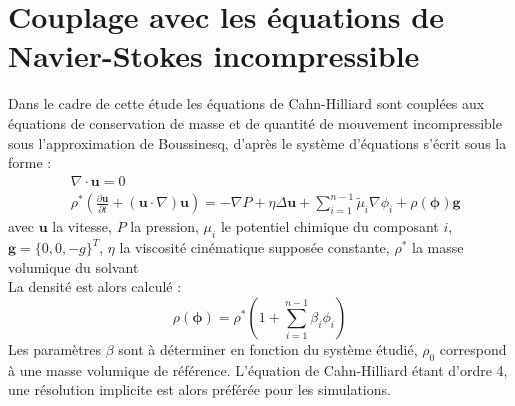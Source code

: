 \section{Couplage avec les équations de Navier-Stokes incompressible}
Dans le cadre de cette étude les équations de Cahn-Hilliard sont couplées aux équations de conservation de masse et de quantité de mouvement incompressible sous l'approximation de Boussinesq, d'après \cite{kim_phase-field_2012} le système d'équations s'écrit sous la forme :
\begin{subequations}
\begin{align}
&\nabla \cdot \mathbf{u} = 0\\
&\rho^* \left (\frac{\partial \mathbf{u}}{\partial t} + (\mathbf{u} \cdot {\nabla})\mathbf{u}\right) = -{\nabla} P +\eta \Delta \mathbf{u}+\sum_{i=1}^{n-1} \tilde{\mu}_i{\nabla} \phi_i + \rho(\bm{\phi}) \mathbf{g}
\end{align}
\end{subequations}
avec $\mathbf{u}$ la vitesse, $P$ la pression, $\mu_i$ le potentiel chimique du composant $i$, $\mathbf{g} = \{ 0,0,-g\}^T $, $\eta$ la viscosité cinématique supposée constante, $\rho^*$ la masse volumique du solvant \\
La densité est alors calculé : 
\begin{equation}
	\rho(\bm{\phi}) = \rho^*\left(1+\sum_{i=1}^{n-1}\beta_i \phi_i\right)
\end{equation}
Les paramètres $\beta$ sont à déterminer en fonction du système étudié, $\rho_0$ correspond à une masse volumique de référence. L'équation de Cahn-Hilliard étant d'ordre 4, une résolution implicite est alors préférée pour les simulations.
